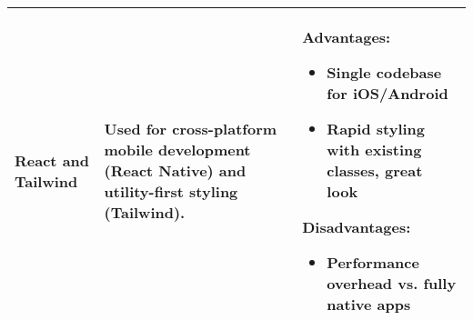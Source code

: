 \documentclass{article}
\begin{document}
\begin{table}[htbp]
\begin{tabularx}{\textwidth}{p{2cm} p{4cm} X}
  \textbf{React and Tailwind} 
  & Used for cross-platform mobile development (React Native) and utility-first styling (Tailwind).
  & \textbf{Advantages:}
    \begin{itemize}
      \item Single codebase for iOS/Android
      \item Rapid styling with existing classes, great look
    \end{itemize}
    \textbf{Disadvantages:}
    \begin{itemize}
      \item Performance overhead vs. fully native apps
    \end{itemize}
  \\
  \midrule
  \bottomrule
  \end{tabularx}
\end{table}

\end{document}
